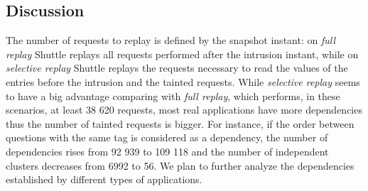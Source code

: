 \subsection{Discussion}\label{sec:eval:accuracy:discussion}
The number of requests to replay is defined by the snapshot instant: on \textit{full replay} Shuttle replays all requests performed after the intrusion instant, while on \textit{selective replay} Shuttle replays the requests necessary to read the values of the entries before the intrusion and the tainted requests. While \textit{selective replay} seems to have a big advantage comparing with  \textit{full replay}, which performs, in these scenarios, at least 38 620 requests, most real applications have more dependencies thus the number of tainted requests is bigger. For instance, if the order between questions with the same tag is considered as a dependency,  the number of dependencies rises from 92 939 to 109 118 and the number of independent clusters decreases from 6992 to 56. We plan to further analyze the dependencies established by different types of applications.






